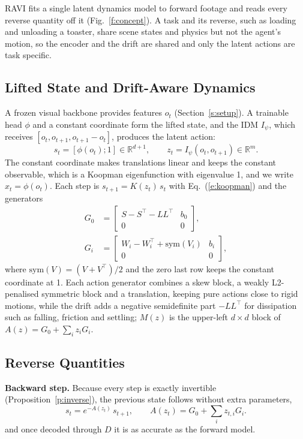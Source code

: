 \documentclass{jcse}
\newcommand{\method}{RAVI}
\newcommand{\R}{\mathbb{R}}
\newcommand{\sym}{\mathrm{sym}}
\begin{document}
{\method} fits a single latent dynamics model to forward footage and reads every reverse quantity off it (Fig.~\ref{f:concept}).
A task and its reverse, such as loading and unloading a toaster, share scene states and physics but not the agent's motion, so the encoder and the drift are shared and only the latent actions are task specific.

\subsection{Lifted State and Drift-Aware Dynamics}
A frozen visual backbone provides features $o_t$ (Section~\ref{s:setup}). A trainable head $\phi$ and a constant coordinate form the lifted state, and the IDM $I_\psi$, which receives $[o_t,o_{t+1},o_{t+1}-o_t]$, produces the latent action:
\begin{equation}
s_t=[\phi(o_t);1]\in\R^{d+1},\qquad z_t=I_\psi(o_t,o_{t+1})\in\R^{m}.
\label{e:state}
\end{equation}
The constant coordinate makes translations linear and keeps the constant observable, which is a Koopman eigenfunction with eigenvalue 1, and we write $x_t=\phi(o_t)$.
Each step is $s_{t+1}=K(z_t)\,s_t$ with Eq.~(\ref{e:koopman}) and the generators
\begin{align}
G_0&=\begin{bmatrix} S-S^\top-LL^\top & b_0\\ 0 & 0\end{bmatrix},\nonumber\\
G_i&=\begin{bmatrix} W_i-W_i^\top+\sym(V_i) & b_i\\ 0 & 0\end{bmatrix},
\label{e:gens}
\end{align}
where $\sym(V)=(V+V^\top)/2$ and the zero last row keeps the constant coordinate at 1.
Each action generator combines a skew block, a weakly L2-penalised symmetric block and a translation, keeping pure actions close to rigid motions, while the drift adds a negative semidefinite part $-LL^\top$ for dissipation such as falling, friction and settling; $M(z)$ is the upper-left $d\times d$ block of $A(z)=G_0+\sum_iz_iG_i$.

\subsection{Reverse Quantities}
\textbf{Backward step.} Because every step is exactly invertible (Proposition~\ref{p:inverse}), the previous state follows without extra parameters,
\begin{equation}
s_t=e^{-A(z_t)}\,s_{t+1},\qquad A(z_t)=G_0+\textstyle\sum_iz_{t,i}G_i.
\label{e:backward}
\end{equation}
and once decoded through $D$ it is as accurate as the forward model.
\end{document}

